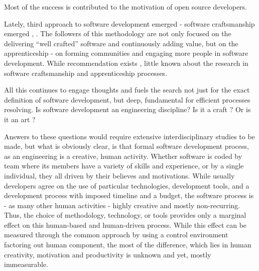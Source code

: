 Most of the success is contributed to the motivation of open source developers.

Lately, third approach to software development emerged - software craftsmanship emerged 
\cite{citeulike:11058561}, \cite{citeulike:11058554}. The followers of this methodology 
are not only focused on the delivering ``well crafted'' software and continuously adding value,
but on the apprenticeship - on forming communities and engaging more people in software development.
While recommendation exists \cite{citeulike:11058784}, little known about the research 
in software craftsmanship and apprenticeship processes.

All this continues to engage thoughts and fuels the search not just for the exact definition 
of software development, but deep, fundamental for efficient processes resolving. 
Is software development an engineering discipline? Is it a craft \cite{citeulike:5203446}? 
Or is it an art \cite{citeulike:11045694}?

Answers to these questions would require extensive interdisciplinary studies to be made, 
but what is obviously clear, is that formal software development process, as an engineering 
is a creative, human activity. 
Whether software is coded 
by team where its members have a variety of skills and experience, or by a single individual,
they all driven by their believes and motivations. While usually developers agree on the use of 
particular technologies, development tools, and a development process with imposed timeline and 
a budget, the software process is - as many other human activities - highly creative and mostly 
non-recurring. Thus, the choice of methodology, technology, or tools provides only a marginal 
effect on this human-based and human-driven process. While this effect can be measured through 
the common approach by using a control environment factoring out human component, the most of 
the difference, which lies in human creativity, motivation and productivity is unknown and yet, 
mostly immeasurable.

